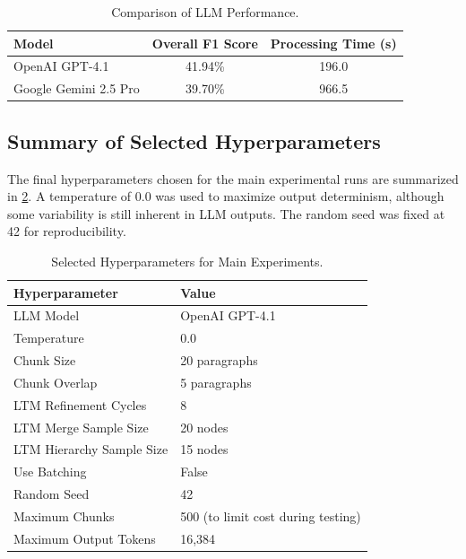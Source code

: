 \begin{table}[!htbp]
\centering
\begin{tabular}{@{}lcc@{}}
\toprule
\textbf{Model} & \textbf{Overall F1 Score} & \textbf{Processing Time (s)} \\ \midrule
OpenAI GPT-4.1 & 41.94\% & 196.0 \\
Google Gemini 2.5 Pro & 39.70\% & 966.5 \\ \bottomrule
\end{tabular}
\caption{Comparison of LLM Performance.}
\label{tab:model_comparison}
\end{table}

\subsection{Summary of Selected Hyperparameters}
The final hyperparameters chosen for the main experimental runs are summarized in \cref{tab:final_hyperparameters}. A temperature of 0.0 was used to maximize output determinism, although some variability is still inherent in LLM outputs. The random seed was fixed at 42 for reproducibility.

\begin{table}[!htbp]
\centering
\begin{tabular}{@{}ll@{}}
\toprule
\textbf{Hyperparameter} & \textbf{Value} \\ \midrule
LLM Model & OpenAI GPT-4.1 \\
Temperature & 0.0 \\
Chunk Size & 20 paragraphs \\
Chunk Overlap & 5 paragraphs \\
LTM Refinement Cycles & 8 \\
LTM Merge Sample Size & 20 nodes \\
LTM Hierarchy Sample Size & 15 nodes \\
Use Batching & False \\
Random Seed & 42 \\
Maximum Chunks & 500 (to limit cost during testing) \\
Maximum Output Tokens & 16,384 \\ \bottomrule
\end{tabular}
\caption{Selected Hyperparameters for Main Experiments.}
\label{tab:final_hyperparameters}
\end{table}

